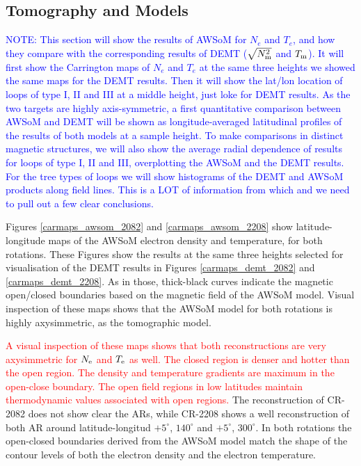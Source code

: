 \documentclass[namedreferences]{solarphysics}
\newcommand{\mdeg}{^\circ}
\newcommand{\Te}{T_{\rm e}}
\newcommand{\Tm}{T_{\rm m}}
\newcommand{\Ne}{N_{\rm e}}
\newcommand{\Nsqm}{N^2_{{\rm m}}}
\newcommand{\sqravgN}{\sqrt{\Nsqm}}
\def\diego#1{\textcolor{red}{#1}}
\def\notebyalbert#1{\textcolor{blue}{NOTE: #1}}
\begin{document}
\begin{article}
\subsection{Tomography and Models}\label{awsom_res} 

\noindent\notebyalbert{This section will show the results of AWSoM for $N_e$ and $T_e$, and how they compare with the corresponding results of DEMT ($\sqravgN$ and $\Tm$). It will first show the Carrington maps of $N_e$ and $T_e$ at the same three heights we showed the same maps for the DEMT results. Then it will show the lat/lon location of loops of type I, II and III at a middle height, just loke for DEMT results. As the two targets are highly axis-symmetric, a first quantitative comparison between AWSoM and DEMT will be shown as longitude-averaged latitudinal profiles of the results of both models at a sample height. To make comparisons in distinct magnetic structures, we will also show the average radial dependence of results for loops of type I, II and III, overplotting the AWSoM and the DEMT results. For the tree types of loops we will show histograms of the DEMT and AWSoM products along field lines. This is a LOT of information from which and we need to pull out a few clear conclusions.}

Figures \ref{carmaps_awsom_2082} and \ref{carmaps_awsom_2208} show latitude-longitude maps of the AWSoM electron density and temperature, for both rotations. These Figures show the results at the same three heights selected for visualisation of the DEMT results in Figures \ref{carmaps_demt_2082} and \ref{carmaps_demt_2208}. As in those, thick-black curves indicate the magnetic open/closed boundaries based on the magnetic field of the AWSoM model. Visual inspection of these maps shows that the AWSoM model for both rotations is highly axysimmetric, as the tomographic model.


\diego{A visual inspection of these maps shows that both reconstructions are very axysimmetric for $\Ne$ and $\Te$ as well. The closed region is denser and hotter than the open region. The density and temperature gradients are maximum in the open-close boundary. The open field regions in low latitudes maintain thermodynamic values associated with open regions.} The reconstruction of CR-2082 does not show clear the ARs, while CR-2208 shows a well reconstruction of both AR around latitude-longitud $+5\mdeg$, $140\mdeg$ and $+5\mdeg$, $300\mdeg$. In both rotations the open-closed boundaries derived from the AWSoM model match the shape of the contour levels of both the electron density and the electron temperature.


\end{article}
\end{document}
